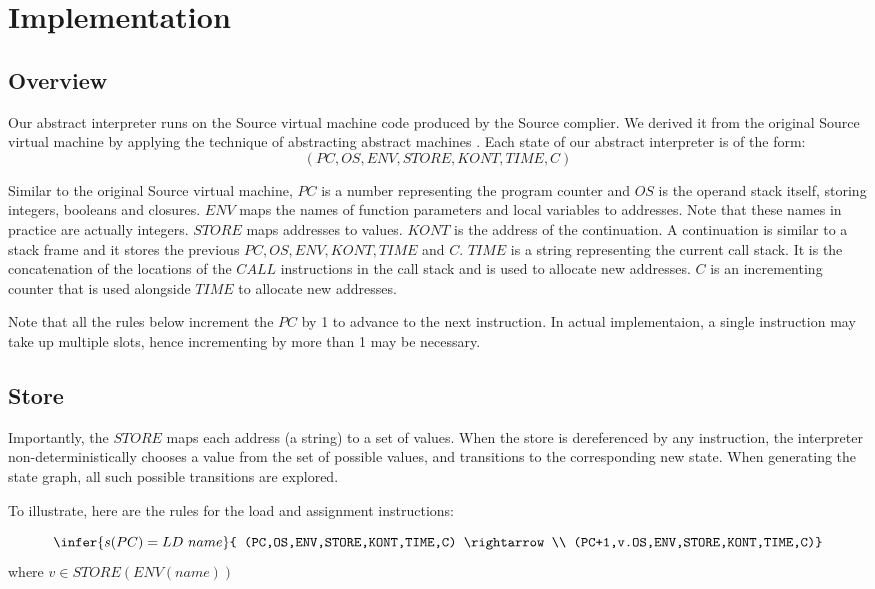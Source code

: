 \documentclass[12pt]{article}
\begin{document}
\section{Implementation}
\subsection{Overview}
Our abstract interpreter runs on the Source virtual machine code produced by the Source complier. We derived it from the original Source virtual machine by applying the technique of abstracting abstract machines \cite{aam}. Each state of our abstract interpreter is of the form:
$$(PC,OS,ENV,STORE,KONT,TIME,C)$$

Similar to the original Source virtual machine, $PC$ is a number representing the program counter and $OS$ is the operand stack itself, storing integers, booleans and closures. $ENV$ maps the names of function parameters and local variables to addresses. Note that these names in practice are actually integers. $STORE$ maps addresses to values. $KONT$ is the address of the continuation. A continuation is similar to a stack frame and it stores the previous $PC,OS,ENV,KONT,TIME$ and $C$. $TIME$ is a string representing the current call stack. It is the concatenation of the locations of the $CALL$ instructions in the call stack and is used to allocate new addresses. $C$ is an incrementing counter that is used alongside $TIME$ to allocate new addresses.

Note that all the rules below increment the $PC$ by 1 to advance to the next instruction. In actual implementaion, a single instruction may take up multiple slots, hence incrementing by more than 1 may be necessary.

\subsection{Store}
Importantly, the $STORE$ maps each address (a string) to a set of values. When the store is dereferenced by any instruction, the interpreter non-deterministically chooses a value from the set of possible values, and transitions to the corresponding new state. When generating the state graph, all such possible transitions are explored.

To illustrate, here are the rules for the load and assignment instructions:

$$\infer{s(PC) = LD\ name}{
    (PC,OS,ENV,STORE,KONT,TIME,C) \rightarrow \\
    (PC+1,v.OS,ENV,STORE,KONT,TIME,C)}$$
where $v \in STORE(ENV(name))$
\end{document}
